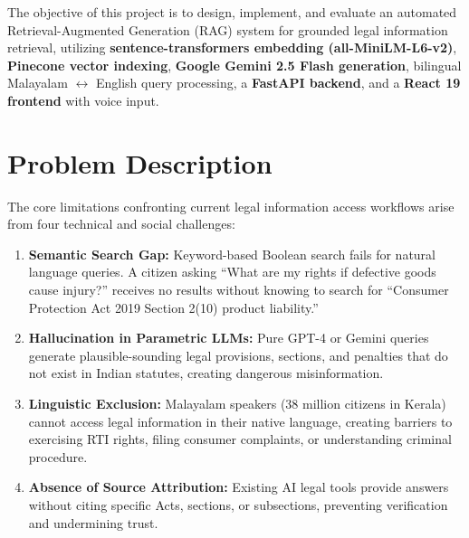 \documentclass[12pt,a4paper]{report}
\begin{document}
The objective of this project is to design, implement, and evaluate an automated Retrieval-Augmented Generation (RAG) system for grounded legal information retrieval, utilizing \textbf{sentence-transformers embedding (all-MiniLM-L6-v2)}, \textbf{Pinecone vector indexing}, \textbf{Google Gemini 2.5 Flash generation}, bilingual Malayalam $\leftrightarrow$ English query processing, a \textbf{FastAPI backend}, and a \textbf{React 19 frontend} with voice input.

\section{Problem Description}
The core limitations confronting current legal information access workflows arise from four technical and social challenges:
\begin{enumerate}
    \item \textbf{Semantic Search Gap:} Keyword-based Boolean search fails for natural language queries. A citizen asking ``What are my rights if defective goods cause injury?'' receives no results without knowing to search for ``Consumer Protection Act 2019 Section 2(10) product liability.''
    \item \textbf{Hallucination in Parametric LLMs:} Pure GPT-4 or Gemini queries generate plausible-sounding legal provisions, sections, and penalties that do not exist in Indian statutes, creating dangerous misinformation.
    \item \textbf{Linguistic Exclusion:} Malayalam speakers (38 million citizens in Kerala) cannot access legal information in their native language, creating barriers to exercising RTI rights, filing consumer complaints, or understanding criminal procedure.
    \item \textbf{Absence of Source Attribution:} Existing AI legal tools provide answers without citing specific Acts, sections, or subsections, preventing verification and undermining trust.
\end{enumerate}
\end{document}
